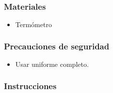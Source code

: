 \subsubsection{Materiales}

\begin{itemize}
	\item Termómetro
\end{itemize}

\subsubsection{Precauciones de seguridad}
\begin{itemize}
	\item Usar uniforme completo.
\end{itemize}

\subsubsection{Instrucciones}
